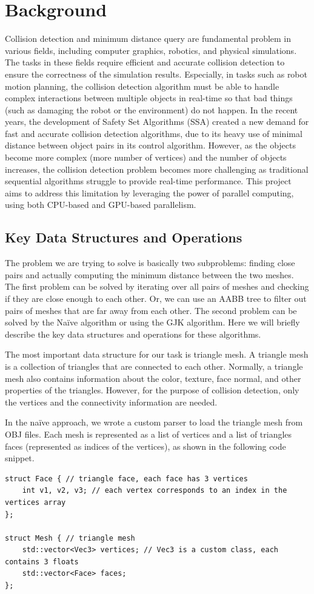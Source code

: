 \documentclass[12pt,fleqn]{article}
\begin{document}
\section{Background}
Collision detection and minimum distance query are fundamental problem in various fields, including computer graphics, robotics, and physical simulations.
The tasks in these fields require efficient and accurate collision detection to ensure the correctness of the simulation results.
Especially, in tasks such as robot motion planning, the collision detection algorithm must be able to handle complex interactions between multiple objects in real-time so that bad things (such as damaging the robot or the environment) do not happen. In the recent years, the development of Safety Set Algorithms (SSA) created a new demand for fast and accurate collision detection algorithms, due to its heavy use of minimal distance between object pairs in its control algorithm.
However, as the objects become more complex (more number of vertices) and the number of objects increases, the collision detection problem becomes more challenging as traditional sequential algorithms struggle to provide real-time performance.
This project aims to address this limitation by leveraging the power of parallel computing, using both CPU-based and GPU-based parallelism.


\subsection{Key Data Structures and Operations}
The problem we are trying to solve is basically two subproblems: finding close pairs and actually computing the minimum distance between the two meshes.
The first problem can be solved by iterating over all pairs of meshes and checking if they are close enough to each other. Or, we can use an AABB tree to filter out pairs of meshes that are far away from each other.
The second problem can be solved by the Naïve algorithm or using the GJK algorithm. Here we will briefly describe the key data structures and operations for these algorithms.


The most important data structure for our task is triangle mesh.
A triangle mesh is a collection of triangles that are connected to each other.
Normally, a triangle mesh also contains information about the color, texture, face normal, and other properties of the triangles.
However, for the purpose of collision detection, only the vertices and the connectivity information are needed.

In the naïve approach, we wrote a custom parser to load the triangle mesh from OBJ files.
Each mesh is represented as a list of vertices and a list of triangles faces (represented as indices of the vertices), as shown in the following code snippet.
\begin{verbatim}
struct Face { // triangle face, each face has 3 vertices
    int v1, v2, v3; // each vertex corresponds to an index in the vertices array
};

struct Mesh { // triangle mesh
    std::vector<Vec3> vertices; // Vec3 is a custom class, each contains 3 floats
    std::vector<Face> faces;
};
\end{verbatim}
\end{document}
